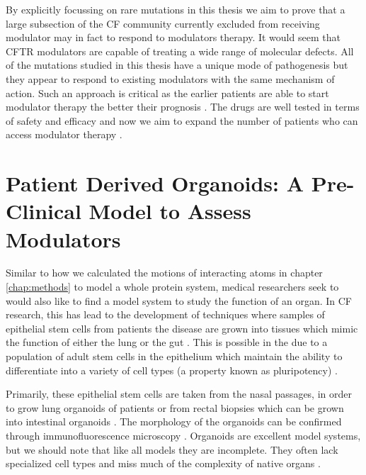 
By explicitly focussing on rare mutations in this thesis we aim to prove that a large subsection of the CF community currently excluded from receiving modulator may in fact to respond to modulators therapy. It would seem that CFTR modulators are capable of treating a wide range of molecular defects. All of the mutations studied in this thesis have a unique mode of pathogenesis but they appear to respond to existing modulators with the same mechanism of action. Such an approach is critical as the earlier patients are able to start modulator therapy the better their prognosis \cite{lahiri2022}. The drugs are well tested in terms of safety and efficacy and now we aim to expand the number of patients who can access modulator therapy \cite{lahiri2022}.

\section{Patient Derived Organoids: A Pre-Clinical Model to Assess Modulators}
Similar to how we calculated the motions of interacting atoms in chapter \ref{chap:methods} to model a whole protein system, medical researchers seek to would also like to find a model system to study the function of an organ. In CF research, this has lead to the development of techniques where samples of epithelial stem cells from patients the disease are grown into tissues which mimic the function of either the lung or the gut \cite{wong2015,depoel2020}. This is possible in the due to a population of adult stem cells in the epithelium which maintain the ability to differentiate into a variety of cell types (a property known as pluripotency) \cite{blanpain2007}. 

Primarily, these epithelial stem cells are taken from the nasal passages, in order to grow lung organoids of patients or from rectal biopsies which can be grown into intestinal organoids \cite{awatade2021,sato2011}. The morphology of the organoids can be confirmed through immunofluorescence microscopy \cite{awatade2021, im2019}. Organoids are excellent model systems, but we should note that like all models they are incomplete. They often lack specialized cell types and miss much of the complexity of native organs \cite{clevers2016}. 

